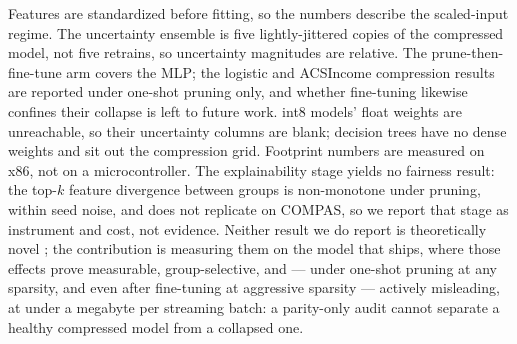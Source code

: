 \documentclass{article}
\begin{document}
Features are standardized before fitting, so the numbers describe the scaled-input regime. The uncertainty ensemble is five lightly-jittered copies of the compressed model, not five retrains, so uncertainty magnitudes are relative. The prune-then-fine-tune arm covers the MLP; the logistic and ACSIncome compression results are reported under one-shot pruning only, and whether fine-tuning likewise confines their collapse is left to future work. int8 models' float weights are unreachable, so their uncertainty columns are blank; decision trees have no dense weights and sit out the compression grid. Footprint numbers are measured on x86, not on a microcontroller. The explainability stage yields no fairness result: the top-$k$ feature divergence between groups is non-monotone under pruning, within seed noise, and does not replicate on COMPAS, so we report that stage as instrument and cost, not evidence. Neither result we do report is theoretically novel \cite{kleinberg2017,chouldechova2017,hooker2020}; the contribution is measuring them on the model that ships, where those effects prove measurable, group-selective, and --- under one-shot pruning at any sparsity, and even after fine-tuning at aggressive sparsity --- actively misleading, at under a megabyte per streaming batch: a parity-only audit cannot separate a healthy compressed model from a collapsed one.
\end{document}
